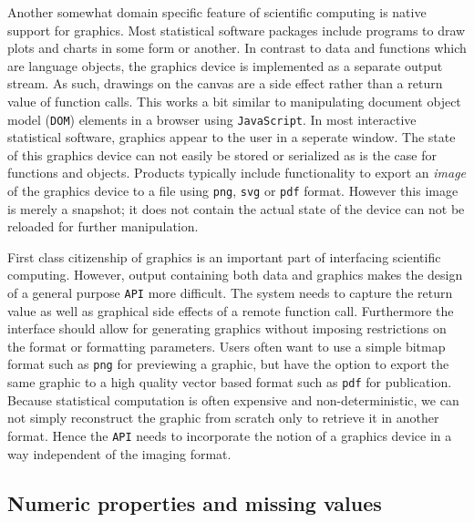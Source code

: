 \documentclass{article}
\newcommand{\JavaScript}{\texttt{JavaScript}\xspace}
\newcommand{\API}{\texttt{API}\xspace}
\begin{document}
Another somewhat domain specific feature of scientific computing is native support for graphics. Most statistical software packages include programs to draw plots and charts in some form or another. In contrast to data and functions which are language objects, the graphics device is implemented as a separate output stream. As such, drawings on the canvas are a side effect rather than a return value of function calls. This works a bit similar to manipulating document object model (\texttt{DOM}) elements in a browser using \JavaScript. In most interactive statistical software, graphics appear to the user in a seperate window. The state of this graphics device can not easily be stored or serialized as is the case for functions and objects. Products typically include functionality to export an \emph{image} of the graphics device to a file using \texttt{png}, \texttt{svg} or \texttt{pdf} format. However this image is merely a snapshot; it does not contain the actual state of the device can not be reloaded for further manipulation.

First class citizenship of graphics is an important part of interfacing scientific computing. However, output containing both data and graphics makes the design of a general purpose \API more difficult. The system needs to capture the return value as well as graphical side effects of a remote function call. Furthermore the interface should allow for generating graphics without imposing restrictions on the format or formatting parameters. Users often want to use a simple bitmap format such as \texttt{png} for previewing a graphic, but have the option to export the same graphic to a high quality vector based format such as \texttt{pdf} for publication. Because statistical computation is often expensive and non-deterministic, we can not simply reconstruct the graphic from scratch only to retrieve it in another format. Hence the \API needs to incorporate the notion of a graphics device in a way independent of the imaging format. 

\subsection{Numeric properties and missing values}
\end{document}
